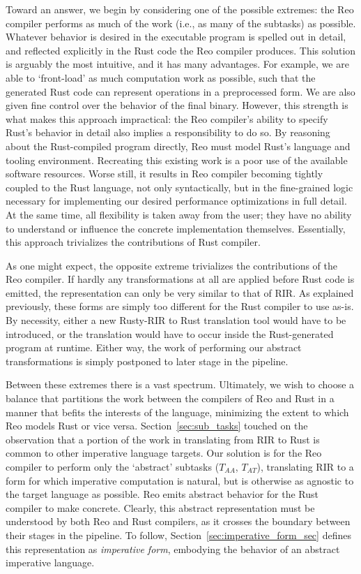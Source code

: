 Toward an answer, we begin by considering one of the possible extremes: the Reo compiler performs as much of the work (i.e., as many of the subtasks) as possible. Whatever behavior is desired in the executable program is spelled out in detail, and reflected explicitly in the Rust code the Reo compiler produces. This solution is arguably the most intuitive, and it has many advantages. For example, we are able to `front-load' as much computation work as possible, such that the generated Rust code can represent operations in a preprocessed form. We are also given fine control over the behavior of the final binary. However, this strength is what makes this approach impractical: the Reo compiler's ability to specify Rust's behavior in detail also implies a responsibility to do so. By reasoning about the Rust-compiled program directly, Reo must model Rust's language and tooling environment. Recreating this existing work is a poor use of the available software resources. Worse still, it results in Reo compiler becoming tightly coupled to the Rust language, not only syntactically, but in the fine-grained logic necessary for implementing our desired performance optimizations in full detail. At the same time, all flexibility is taken away from the user; they have no ability to understand or influence the concrete implementation themselves. Essentially, this approach trivializes the contributions of Rust compiler.

As one might expect, the opposite extreme trivializes the contributions of the Reo compiler. If hardly any transformations at all are applied before Rust code is emitted, the representation can only be very similar to that of RIR. As explained previously, these forms are simply too different for the Rust compiler to use as-is. By necessity, either a new Rusty-RIR to Rust translation tool would have to be introduced, or the translation would have to occur inside the Rust-generated program at runtime. Either way, the work of performing our abstract transformations is simply postponed to later stage in the pipeline.

Between these extremes there is a vast spectrum. Ultimately, we wish to choose a balance that partitions the work between the compilers of Reo and Rust in a manner that befits the interests of the language, minimizing the extent to which Reo models Rust or vice versa. Section~\ref{sec:sub_tasks} touched on the observation that a portion of the work in translating from RIR to Rust is common to other imperative language targets. Our solution is for the Reo compiler to perform only the `abstract' subtasks ($T_{AA}$, $T_{AT}$), translating RIR to a form for which imperative computation is natural, but is otherwise as agnostic to the target language as possible. Reo emits abstract behavior for the Rust compiler to make concrete. Clearly, this abstract representation must be understood by both Reo and Rust compilers, as it crosses the boundary between their stages in the pipeline. To follow, Section~\ref{sec:imperative_form_sec} defines this representation as \textit{imperative form}, embodying the behavior of an abstract imperative language.

